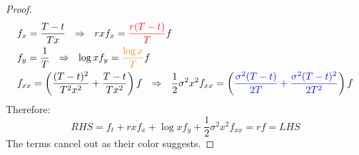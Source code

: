 \documentclass[a4paper, 10pt]{article}
\theoremstyle{definition}
\theoremstyle{hSol}
\begin{document}
\begin{proof}
\begin{equation}
\begin{split}
    &f_x = \frac{T-t}{Tx}~~\Rightarrow~~rxf_x= \textcolor{red}{\frac{r(T-t)}{T}}f \\
    &f_y = \frac{1}{T}~~\Rightarrow~~\log x f_y = \textcolor{orange}{\frac{\log x}{T}}f \\
    &f_{xx} = \left(\frac{(T-t)^2}{T^2x^2} + \frac{T-t}{Tx^2}\right)f ~~\Rightarrow~~\frac{1}{2}\sigma^2 x^2f_{xx} =  \left(\textcolor{blue}{\frac{\sigma^2(T-t)}{2T} + \frac{\sigma^2(T-t)^2}{2T^2}}\right)f
  \end{split}
\end{equation}
Therefore:
\begin{equation}
  RHS = f_t + rxf_x + \log x f_y + \frac{1}{2} \sigma^2 x^2f_{xx} = rf = LHS
\end{equation}
The terms cancel out as their color suggests.
\end{proof}
\end{document}
